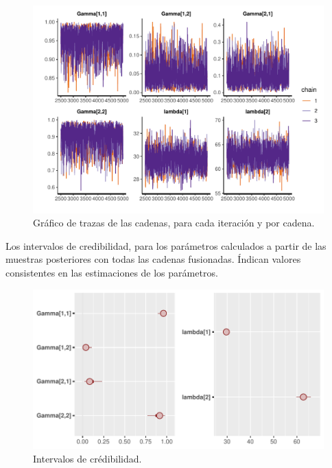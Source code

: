 \documentclass[a4paper]{article}\usepackage[]{graphicx}\usepackage[]{color}
\makeatletter
\def\maxwidth{ %
  \ifdim\Gin@nat@width>\linewidth
    \linewidth
  \else
    \Gin@nat@width
  \fi
}
\newenvironment{knitrout}{}{} %
\makeatother
\begin{document}
\begin{knitrout}
\color{fgcolor}\begin{figure}
\includegraphics[width=\maxwidth]{figure/unnamed-chunk-32-1} \caption[Gráfico de trazas de las cadenas, para cada iteración y por cadena]{Gráfico de trazas de las cadenas, para cada iteración y por cadena.}\label{fig:unnamed-chunk-32}
\end{figure}


\end{knitrout}
                              
Los intervalos de credibilidad, para los parámetros calculados a partir de las muestras posteriores con todas las cadenas fusionadas. Índican valores consistentes en las estimaciones de los parámetros.

\begin{knitrout}
\color{fgcolor}\begin{figure}
\includegraphics[width=\maxwidth]{figure/unnamed-chunk-33-1} \caption[Intervalos de crédibilidad]{Intervalos de crédibilidad.}\label{fig:unnamed-chunk-33}
\end{figure}


\end{knitrout}
\end{document}
